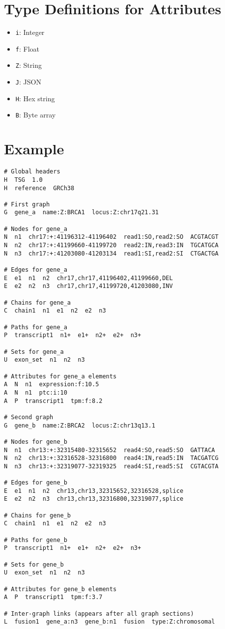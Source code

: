 \documentclass{article}
\begin{document}
\section{Type Definitions for Attributes}

\begin{itemize}
	\item \texttt{i}: Integer
	\item \texttt{f}: Float
	\item \texttt{Z}: String
	\item \texttt{J}: JSON
	\item \texttt{H}: Hex string
	\item \texttt{B}: Byte array
\end{itemize}

\section{Example}

\begin{lstlisting}
# Global headers
H  TSG  1.0
H  reference  GRCh38

# First graph
G  gene_a  name:Z:BRCA1  locus:Z:chr17q21.31

# Nodes for gene_a
N  n1  chr17:+:41196312-41196402  read1:SO,read2:SO  ACGTACGT
N  n2  chr17:+:41199660-41199720  read2:IN,read3:IN  TGCATGCA
N  n3  chr17:+:41203080-41203134  read1:SI,read2:SI  CTGACTGA

# Edges for gene_a
E  e1  n1  n2  chr17,chr17,41196402,41199660,DEL
E  e2  n2  n3  chr17,chr17,41199720,41203080,INV

# Chains for gene_a
C  chain1  n1  e1  n2  e2  n3

# Paths for gene_a
P  transcript1  n1+  e1+  n2+  e2+  n3+

# Sets for gene_a
U  exon_set  n1  n2  n3

# Attributes for gene_a elements
A  N  n1  expression:f:10.5
A  N  n1  ptc:i:10
A  P  transcript1  tpm:f:8.2

# Second graph
G  gene_b  name:Z:BRCA2  locus:Z:chr13q13.1

# Nodes for gene_b
N  n1  chr13:+:32315480-32315652  read4:SO,read5:SO  GATTACA
N  n2  chr13:+:32316528-32316800  read4:IN,read5:IN  TACGATCG
N  n3  chr13:+:32319077-32319325  read4:SI,read5:SI  CGTACGTA

# Edges for gene_b
E  e1  n1  n2  chr13,chr13,32315652,32316528,splice
E  e2  n2  n3  chr13,chr13,32316800,32319077,splice

# Chains for gene_b
C  chain1  n1  e1  n2  e2  n3

# Paths for gene_b
P  transcript1  n1+  e1+  n2+  e2+  n3+

# Sets for gene_b
U  exon_set  n1  n2  n3

# Attributes for gene_b elements
A  P  transcript1  tpm:f:3.7

# Inter-graph links (appears after all graph sections)
L  fusion1  gene_a:n3  gene_b:n1  fusion  type:Z:chromosomal
\end{lstlisting}
\end{document}

